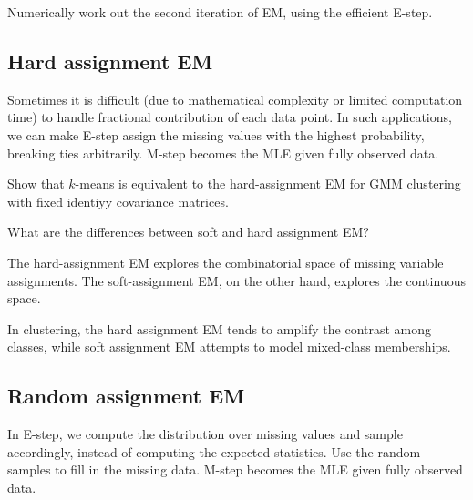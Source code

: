 \documentclass{discussion}
\begin{document}
\begin{exercise} Numerically work out the second iteration of EM, using the efficient E-step. 
\end{exercise}

\subsection{Hard assignment EM}
Sometimes it is difficult (due to mathematical complexity or limited computation time) to handle fractional contribution of each data point. In such applications, we can make E-step assign the missing values with the highest probability, breaking ties arbitrarily. M-step becomes the MLE given fully observed data.

\begin{exercise}
	Show that $k$-means is equivalent to the hard-assignment EM for GMM clustering with fixed identiyy covariance matrices.
\end{exercise}

\begin{exercise}
What are the differences between soft and hard assignment EM?
\end{exercise}
	The hard-assignment EM explores the combinatorial space of missing variable assignments. The soft-assignment EM, on the other hand, explores the continuous space.

	In clustering, the hard assignment EM tends to amplify the contrast among classes, while soft assignment EM attempts to model mixed-class memberships.

\subsection{Random assignment EM}

In E-step, we compute the distribution over missing values and sample accordingly, instead of computing the expected statistics. Use the random samples to fill in the missing data. M-step becomes the MLE given fully observed data.
\end{document}
